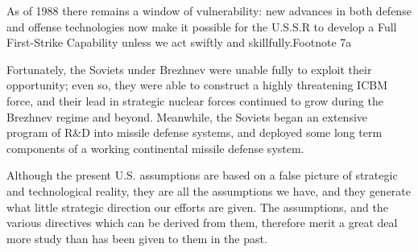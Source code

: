\documentclass[a4paper,12pt]{book}
\begin{document}
As of 1988 there remains a window of vulnerability: new advances in both defense and offense technologies now make it possible for the U.S.S.R to develop a Full First-Strike Capability unless we act swiftly and skillfully.Footnote 7a

Fortunately, the Soviets under Brezhnev were unable fully to exploit their opportunity; even so, they were able to construct a highly threatening ICBM force, and their lead in strategic nuclear forces continued to grow during the Brezhnev regime and beyond. Meanwhile, the Soviets began an extensive program of R\&D into missile defense systems, and deployed some long term components of a working continental missile defense system.

Although the present U.S. assumptions are based on a false picture of strategic and technological reality, they are all the assumptions we have, and they generate what little strategic direction our efforts are given. The assumptions, and the various directives which can be derived from them, therefore merit a great deal more study than has been given to them in the past.
\newline
\end{document}
